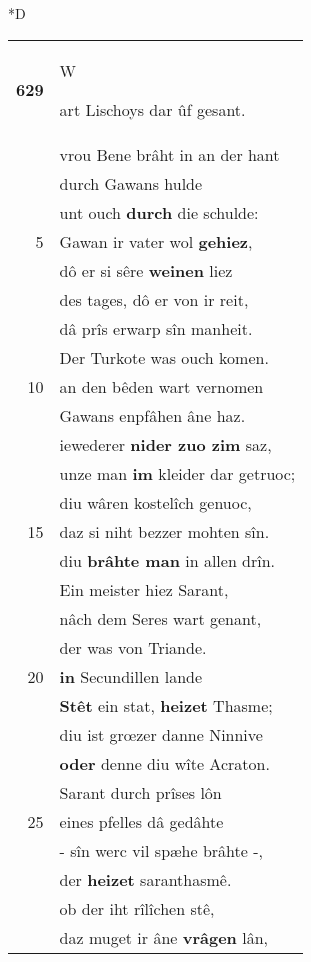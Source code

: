 \documentclass[8pt,a4paper,notitlepage]{article}
\begin{document}
\begin{table}[ht]
\begin{minipage}[t]{0.5\linewidth}
\small
\begin{center}*D
\end{center}
\begin{tabular}{rl}
\textbf{629} & \begin{large}W\end{large}art Lischoys dar ûf gesant.\\ 
 & vrou Bene brâht in an der hant\\ 
 & durch Gawans hulde\\ 
 & unt ouch \textbf{durch} die schulde:\\ 
5 & Gawan ir vater wol \textbf{gehiez},\\ 
 & dô er si sêre \textbf{weinen} liez\\ 
 & des tages, dô er von ir reit,\\ 
 & dâ prîs erwarp sîn manheit.\\ 
 & Der Turkote was ouch komen.\\ 
10 & an den bêden wart vernomen\\ 
 & Gawans enpfâhen âne haz.\\ 
 & iewederer \textbf{nider zuo zim} saz,\\ 
 & unze man \textbf{im} kleider dar getruoc;\\ 
 & diu wâren kostelîch genuoc,\\ 
15 & daz si niht bezzer mohten sîn.\\ 
 & diu \textbf{brâhte man} in allen drîn.\\ 
 & Ein meister hiez Sarant,\\ 
 & nâch dem Seres wart genant,\\ 
 & der was von Triande.\\ 
20 & \textbf{in} Secundillen lande\\ 
 & \textbf{Stêt} ein stat, \textbf{heizet} Thasme;\\ 
 & diu ist grœzer danne Ninnive\\ 
 & \textbf{oder} denne diu wîte Acraton.\\ 
 & Sarant durch prîses lôn\\ 
25 & eines pfelles dâ gedâhte\\ 
 & - sîn werc vil spæhe brâhte -,\\ 
 & der \textbf{heizet} saranthasmê.\\ 
 & ob der iht rîlîchen stê,\\ 
 & daz muget ir âne \textbf{vrâgen} lân,\\ 

\end{tabular}
\end{minipage}
\end{table}
\end{document}
